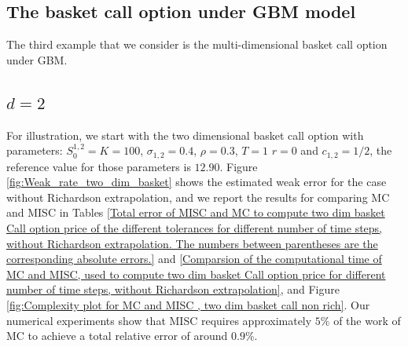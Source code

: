 %
%


\subsection{The basket call option  under GBM  model}\label{sec:The basket call option  under GBM  model}
The third example that we consider  is the multi-dimensional  basket call option under GBM. 
\subsection{$d=2$}
For illustration, we start with the two dimensional basket call option  with parameters:  $S_0^{1,2}=K=100$, $\sigma_{1,2}=0.4$, $\rho=0.3$, $T=1$ $r=0$ and $c_{1,2}=1/2$, the reference value for those parameters  is  $12.90$. Figure \ref{fig:Weak_rate_two_dim_basket} shows the estimated   weak error  for the case without Richardson extrapolation, and we report the results for comparing MC and MISC in Tables \ref{Total error of MISC and MC to compute two  dim basket  Call option price of the different tolerances for different number of time steps, without Richardson extrapolation. The numbers between parentheses are the corresponding absolute errors.} and \ref{Comparsion of the computational time of  MC and MISC, used to compute two dim basket Call option price  for different number of time steps, without Richardson extrapolation}, and Figure \ref{fig:Complexity plot for MC and MISC , two dim basket call non rich}. Our numerical experiments show that MISC  requires approximately $5\%$ of the work of MC  to achieve a total relative error of around $0.9\%$.

